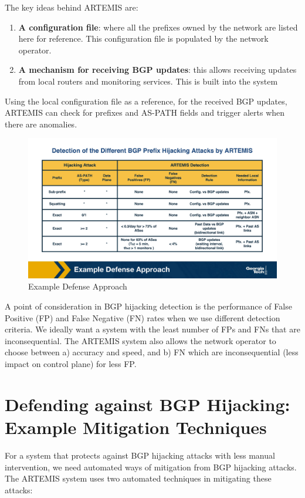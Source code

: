 \documentclass[11pt]{article}
\begin{document}
The key ideas behind ARTEMIS are:

\begin{enumerate}
\item \textbf{A configuration file}: where all the prefixes owned by the network are listed here for reference. This configuration file is populated by the network operator.
\item \textbf{A mechanism for receiving BGP updates}: this allows receiving updates from local routers and monitoring services. This is built into the system
\end{enumerate}

Using the local configuration file as a reference, for the received BGP updates, ARTEMIS can check for prefixes and AS-PATH fields and trigger alerts when there are anomalies.

\begin{figure}[htbp]
\centering
\includegraphics[width=.9\linewidth]{./MD_Figures/9_defending_bgp_attack_1.png}
\caption{\label{fig:org572da35}Example Defense Approach}
\end{figure}

A point of consideration in BGP hijacking detection is the performance of False Positive (FP) and False Negative (FN) rates when we use different detection criteria. We ideally want a system with the least number of FPs and FNs that are inconsequential. The ARTEMIS system also allows the network operator to choose between a) accuracy and speed, and b) FN which are inconsequential (less impact on control plane) for less FP.


\section{Defending against BGP Hijacking: Example Mitigation Techniques}
\label{sec:orgd8c56bd}

For a system that protects against BGP hijacking attacks with less manual intervention, we need automated ways of mitigation from BGP hijacking attacks. The ARTEMIS system uses two automated techniques in mitigating these attacks:
\end{document}
